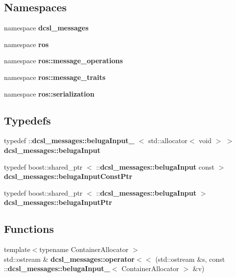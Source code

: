 \subsection*{\-Namespaces}
\begin{DoxyCompactItemize}
\item 
namespace {\bf dcsl\-\_\-messages}
\item 
namespace {\bf ros}
\item 
namespace {\bf ros\-::message\-\_\-operations}
\item 
namespace {\bf ros\-::message\-\_\-traits}
\item 
namespace {\bf ros\-::serialization}
\end{DoxyCompactItemize}
\subsection*{\-Typedefs}
\begin{DoxyCompactItemize}
\item 
typedef \*
\-::{\bf dcsl\-\_\-messages\-::beluga\-Input\-\_\-}\*
$<$ std\-::allocator$<$ void $>$ $>$ {\bf dcsl\-\_\-messages\-::beluga\-Input}
\item 
typedef boost\-::shared\-\_\-ptr\*
$<$ \-::{\bf dcsl\-\_\-messages\-::beluga\-Input} \*
const  $>$ {\bf dcsl\-\_\-messages\-::beluga\-Input\-Const\-Ptr}
\item 
typedef boost\-::shared\-\_\-ptr\*
$<$ \-::{\bf dcsl\-\_\-messages\-::beluga\-Input} $>$ {\bf dcsl\-\_\-messages\-::beluga\-Input\-Ptr}
\end{DoxyCompactItemize}
\subsection*{\-Functions}
\begin{DoxyCompactItemize}
\item 
{\footnotesize template$<$typename Container\-Allocator $>$ }\\std\-::ostream \& {\bf dcsl\-\_\-messages\-::operator$<$$<$} (std\-::ostream \&s, const \-::{\bf dcsl\-\_\-messages\-::beluga\-Input\-\_\-}$<$ \-Container\-Allocator $>$ \&v)
\end{DoxyCompactItemize}
